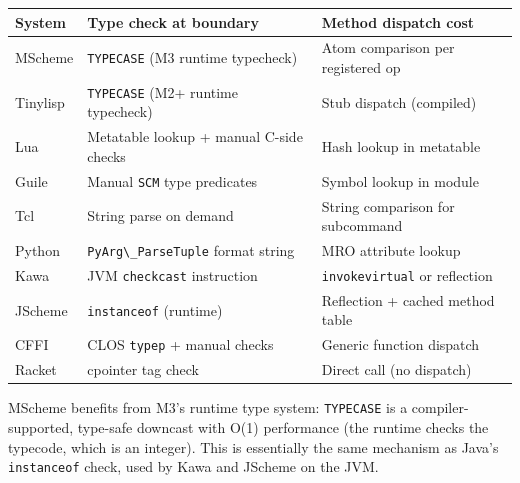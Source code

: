 \documentclass[
  12pt,
]{report}
\newcommand{\passthrough}[1]{#1}
\newcounter{none} %
\begin{document}
{\def\LTcaptype{none} %
\begin{longtable}[]{@{}
  >{\raggedright\arraybackslash}p{}
  >{\raggedright\arraybackslash}p{}
  >{\raggedright\arraybackslash}p{}@{}}
\toprule\noalign{}
\begin{minipage}[b]{\linewidth}\raggedright
System
\end{minipage} & \begin{minipage}[b]{\linewidth}\raggedright
Type check at boundary
\end{minipage} & \begin{minipage}[b]{\linewidth}\raggedright
Method dispatch cost
\end{minipage} \\
\midrule\noalign{}
\endhead
\bottomrule\noalign{}
\endlastfoot
MScheme & \passthrough{\lstinline!TYPECASE!} (M3 runtime typecheck) &
Atom comparison per registered op \\
Tinylisp & \passthrough{\lstinline!TYPECASE!} (M2+ runtime typecheck) &
Stub dispatch (compiled) \\
Lua & Metatable lookup + manual C-side checks & Hash lookup in
metatable \\
Guile & Manual \passthrough{\lstinline!SCM!} type predicates & Symbol
lookup in module \\
Tcl & String parse on demand & String comparison for subcommand \\
Python & \passthrough{\lstinline!PyArg\_ParseTuple!} format string & MRO
attribute lookup \\
Kawa & JVM \passthrough{\lstinline!checkcast!} instruction &
\passthrough{\lstinline!invokevirtual!} or reflection \\
JScheme & \passthrough{\lstinline!instanceof!} (runtime) & Reflection +
cached method table \\
CFFI & CLOS \passthrough{\lstinline!typep!} + manual checks & Generic
function dispatch \\
Racket & cpointer tag check & Direct call (no dispatch) \\
\end{longtable}
}

MScheme benefits from M3's runtime type system:
\passthrough{\lstinline!TYPECASE!} is a compiler-supported, type-safe
downcast with O(1) performance (the runtime checks the typecode, which
is an integer). This is essentially the same mechanism as Java's
\passthrough{\lstinline!instanceof!} check, used by Kawa and JScheme on
the JVM.
\end{document}
